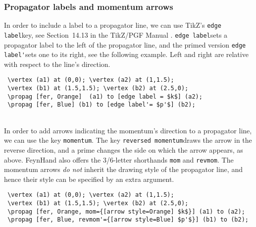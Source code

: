 \documentclass[10pt,letterpaper,twoside,notitlepage]{article}
\numberwithin{figure}{section}
\begin{document}
\subsubsection{Propagator labels and momentum arrows}
\label{sec:_feynmandiagrams_proplabelsmomentum}
%
\noindent
In order to include a label to a propagator line,
we can use TikZ's \blucol\verb!edge label!\txcol key,
see Section~14.13 in the TikZ/PGF Manual \cite{tikz}.
\blucol\verb!edge label!\txcol sets a propagator label 
to the left of the propagator line, and the primed version
\blucol\verb!edge label'!\txcol sets one to its right,
see the following example.
Left and right are relative with respect to the line's direction.
\vspace{2mm}\\
%
\begin{minipage}{0.83\linewidth}
\blucol\begin{verbatim}
 \vertex (a1) at (0,0); \vertex (a2) at (1,1.5);
 \vertex (b1) at (1.5,1.5); \vertex (b2) at (2.5,0);
 \propag [fer, Orange]  (a1) to [edge label = $k$] (a2);
 \propag [fer, Blue] (b1) to [edge label'= $p'$] (b2);
\end{verbatim}\txcol
\end{minipage}
%
\begin{minipage}{0.16\linewidth}
\end{minipage}
\\
In order to add arrows indicating the momentum's direction to a propagator line,
we can use the key \blucol\verb!momentum!\txcol.
The key \blucol\verb!reversed momentum!\txcol draws the arrow in the reverse direction,
and a prime changes the side on which the arrow appears, as above.
FeynHand also offers the 3/6-letter shorthands \blucol\verb!mom!\txcol 
and \blucol\verb!revmom!\txcol.
The momentum arrows \emph{do not} inherit the drawing style of the propagator line,
and hence their style can be specified by an extra argument.
\vspace{2mm}\\
%
\begin{minipage}{0.83\linewidth}
\blucol\begin{verbatim}
 \vertex (a1) at (0,0); \vertex (a2) at (1,1.5);
 \vertex (b1) at (1.5,1.5); \vertex (b2) at (2.5,0);
 \propag [fer, Orange, mom={[arrow style=Orange] $k$}] (a1) to (a2);
 \propag [fer, Blue, revmom'={[arrow style=Blue] $p'$}] (b1) to (b2);
\end{verbatim}\txcol
\end{minipage}
\end{document}

